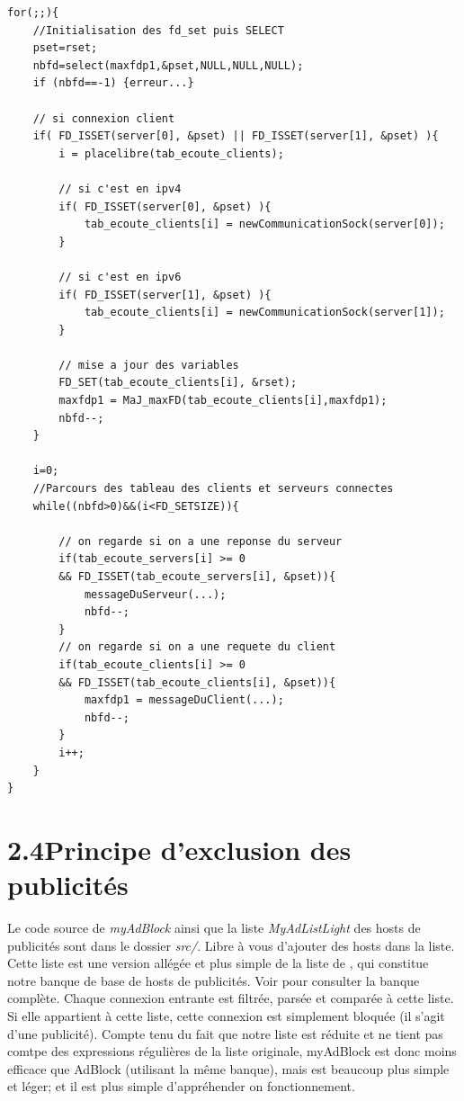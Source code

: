 \documentclass[12pt, a4paper]{report}
\newcommand{\MYhref}[3][blue]{\href{#2}{\color{#1}{#3}}}%
\begin{document}
\renewcommand{\lstlistingname}{Algorithme}
\begin{lstlisting}[caption=Algorithme de gestion multi-clients et gestion IPv4/IPv6 (myAdBlock.c)]
for(;;){
	//Initialisation des fd_set puis SELECT
	pset=rset;
	nbfd=select(maxfdp1,&pset,NULL,NULL,NULL);
	if (nbfd==-1) {erreur...}
	
	// si connexion client
	if( FD_ISSET(server[0], &pset) || FD_ISSET(server[1], &pset) ){
		i = placelibre(tab_ecoute_clients);
		
		// si c'est en ipv4
		if( FD_ISSET(server[0], &pset) ){
			tab_ecoute_clients[i] = newCommunicationSock(server[0]);
		}
		
		// si c'est en ipv6 
		if( FD_ISSET(server[1], &pset) ){	
			tab_ecoute_clients[i] = newCommunicationSock(server[1]);
		}
		
		// mise a jour des variables
		FD_SET(tab_ecoute_clients[i], &rset);
		maxfdp1 = MaJ_maxFD(tab_ecoute_clients[i],maxfdp1);
		nbfd--;
	}
	
	i=0;
	//Parcours des tableau des clients et serveurs connectes
	while((nbfd>0)&&(i<FD_SETSIZE)){
		
		// on regarde si on a une reponse du serveur
		if(tab_ecoute_servers[i] >= 0 
		&& FD_ISSET(tab_ecoute_servers[i], &pset)){
			messageDuServeur(...);
			nbfd--;
		}
		// on regarde si on a une requete du client
		if(tab_ecoute_clients[i] >= 0 
		&& FD_ISSET(tab_ecoute_clients[i], &pset)){
			maxfdp1 = messageDuClient(...);
			nbfd--;
		}
		i++;
	}
}
\end{lstlisting}

\newpage
\section*{\hspace{0.6cm}2.4\hspace{0.6cm}Principe d'exclusion des publicités}

\hspace{1cm}Le code source de \textit{myAdBlock} ainsi que la liste \textit{MyAdListLight} des hosts de publicités sont dans le dossier \textit{src/}. Libre à vous d'ajouter des hosts dans la liste. \\

\hspace{0.40cm}Cette liste est une version allégée et plus simple de la liste de  \MYhref{https://easylist.to}{EasyList}, qui constitue notre banque de base de hosts de publicités. Voir  \MYhref{https://easylist.to/easylist/easylist.txt}{EasyList pour AdBlock Plus 2.0} pour consulter la banque complète. Chaque connexion entrante est filtrée, parsée et comparée à cette liste. Si elle appartient à cette liste, cette connexion est simplement bloquée (il s'agit d'une publicité). Compte tenu du fait que notre liste est réduite et ne tient pas comtpe des expressions régulières de la liste originale, myAdBlock est donc moins efficace que AdBlock (utilisant la même banque), mais est beaucoup plus simple et léger; et il est plus simple d'appréhender on fonctionnement. \\
\end{document}
